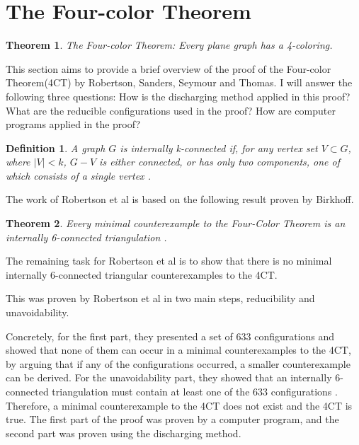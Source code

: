 \documentclass[a4paper, 11pt]{article} %
\newtheorem{theorem}{Theorem}[section]
\newtheorem*{definition}{Definition}
\begin{document}
\section{The Four-color Theorem}

\begin{theorem}
The Four-color Theorem: Every plane graph has a 4-coloring. 
\end{theorem}

This section aims to provide a brief overview of the proof of the Four-color Theorem(4CT) by Robertson, Sanders, Seymour and Thomas. I will answer the following three questions: How is the discharging method applied in this proof? What are the reducible configurations used in the proof? How are computer programs applied in the proof?

\begin{definition}
A graph $G$ is internally k-connected if, for any vertex set $V \subset G$, where $|V| < k$, $G-V$ is either connected, or has only two components, one of which consists of a single vertex \cite{thomas1998update}. 
\end{definition}

The work of Robertson et al is based on the following result proven by Birkhoff. 

\begin{theorem}
Every minimal counterexample to the Four-Color Theorem is an internally 6-connected triangulation \cite{thomas1998update}.
\end{theorem}

The remaining task for Robertson et al is to show that there is no minimal internally 6-connected triangular counterexamples to the 4CT. 

This was proven by Robertson et al in two main steps, reducibility and unavoidability. 

Concretely, for the first part, they presented a set of 633 configurations and showed that none of them can occur in a minimal counterexamples to the 4CT, by arguing that if any of the configurations occurred, a smaller counterexample can be derived. For the unavoidability part, they showed that an internally 6-connected triangulation must contain at least one of the 633 configurations \cite{robertson1997four}. Therefore, a minimal counterexample to the 4CT does not exist and the 4CT is true. The first part of the proof was proven by a computer program, and the second part was proven using the discharging method.
\end{document}
